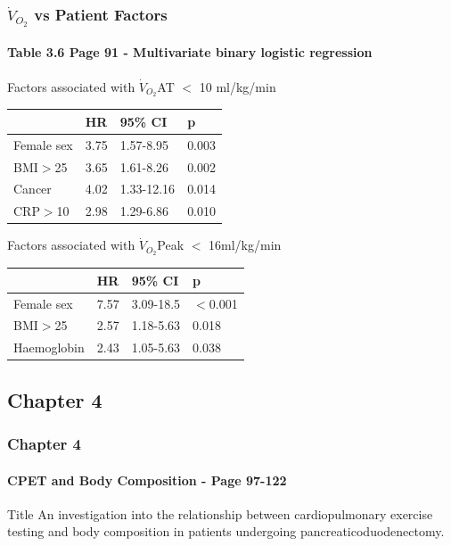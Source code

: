 \documentclass{beamer}
\begin{document}
\begin{frame}
	\frametitle{$\dot{V}_{O_2}$ vs Patient Factors }
	\framesubtitle{Table 3.6 Page 91 - Multivariate binary logistic regression}

	Factors associated with $\dot{V}_{O_2}$AT $<$ 10 ml/kg/min
	\begin{table}
		\begin{tabular}{l l l l}
			           & HR   & 95\% CI    & p     \\ \hline
			Female sex & 3.75 & 1.57-8.95  & 0.003 \\
			BMI$>$25   & 3.65 & 1.61-8.26  & 0.002 \\
			Cancer     & 4.02 & 1.33-12.16 & 0.014 \\
			CRP$>$10   & 2.98 & 1.29-6.86  & 0.010
		\end{tabular}
	\end{table}
	
	Factors associated with $\dot{V}_{O_2}$Peak $<$ 16ml/kg/min
	\begin{table}
		\begin{tabular}{l l l l}
			            & HR   & 95\% CI   & p        \\ \hline
			Female sex  & 7.57 & 3.09-18.5 & $<$0.001 \\
			BMI$>$25    & 2.57 & 1.18-5.63 & 0.018    \\
			Haemoglobin & 2.43 & 1.05-5.63 & 0.038
		\end{tabular}
	\end{table}
\end{frame}


\subsection{Chapter 4}

\begin{frame}
	\frametitle{Chapter 4}
	\framesubtitle{CPET and Body Composition - Page 97-122 }
	\begin{block}{Title}
		An investigation into the relationship between cardiopulmonary exercise testing and body composition in patients undergoing pancreaticoduodenectomy.
	\end{block}
\end{frame}
\end{document}
